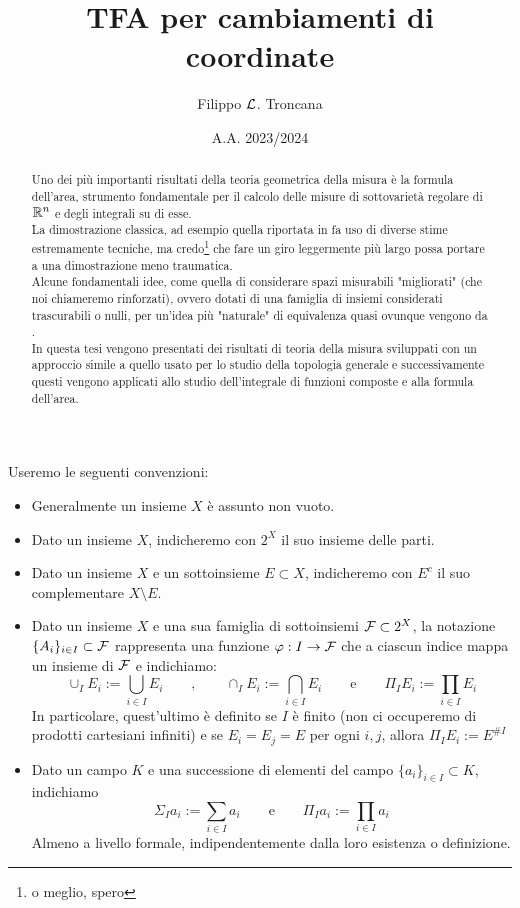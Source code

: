 \documentclass{article}
\title{TFA per cambiamenti di coordinate}
\author{Filippo $\mathcal{L}$. Troncana}
\date{A.A. 2023/2024}
\renewcommand\F{\mc{F}}
\begin{document}
\maketitle

\begin{abstract}
    Uno dei più importanti risultati della teoria geometrica della misura è la formula dell'area, strumento fondamentale per il calcolo delle misure di sottovarietà regolare di $\mathbb{R}^n$ e degli integrali su di esse.\\
    La dimostrazione classica, ad esempio quella riportata in \cite{EvansGariepy1991} fa uso di diverse stime estremamente tecniche, ma credo\footnote{o meglio, spero} che fare un giro leggermente più largo possa portare a una dimostrazione meno traumatica.\\
    Alcune fondamentali idee, come quella di considerare spazi misurabili "migliorati" (che noi chiameremo rinforzati), ovvero dotati di una famiglia di insiemi considerati trascurabili o nulli, per un'idea più "naturale" di equivalenza quasi ovunque vengono da \cite{Fremlin2000}.\\
    In questa tesi vengono presentati dei risultati di teoria della misura sviluppati con un approccio simile a quello usato per lo studio della topologia generale e successivamente questi vengono applicati allo studio dell'integrale di funzioni composte e alla formula dell'area.
\end{abstract}

\tableofcontents

\begin{notation}{}{}
    Useremo le seguenti convenzioni:\begin{itemize}
        \item Generalmente un insieme $X$ è assunto non vuoto.
        \item Dato un insieme $X$, indicheremo con $2^X$ il suo insieme delle parti.
        \item Dato un insieme $X$ e un sottoinsieme $E\subset X$, indicheremo con $E^c$ il suo complementare $X\setminus E$.
        \item Dato un insieme $X$ e una sua famiglia di sottoinsiemi $\F \subset 2^X$, la notazione $\{A_i\}_{i \in I} \subset \F$ rappresenta una funzione $\varphi: I \to \F$ che a ciascun indice mappa un insieme di $\F$ e indichiamo:
        \[\cup_I E_i := \bigcup_{i \in I} E_i \qquad, \qquad \cap_I E_i := \bigcap_{i \in I} E_i \qquad \text{e}\qquad \Pi_I E_i := \prod_{i \in I} E_i \]
        In particolare, quest'ultimo è definito se $I$ è finito (non ci occuperemo di prodotti cartesiani infiniti) e se $E_i = E_j= E $ per ogni $i,j$, allora $\Pi_I E_i := E^{\# I}$
        \item Dato un campo $K$ e una successione di elementi del campo $\{a_i\}_{i \in I}\subset K$, indichiamo
        \[\Sigma_I a_i := \sum_{i \in I} a_i \qquad\text{e} \qquad \Pi_I a_i := \prod_{i \in I} a_i \]
        Almeno a livello formale, indipendentemente dalla loro esistenza o definizione.
    \end{itemize}
\end{notation}
\end{document}
